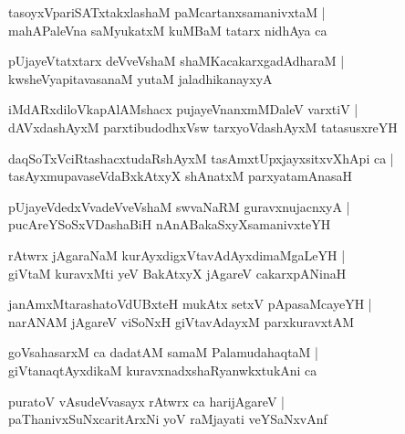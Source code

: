 \documentclass[twoside,12pt,openright]{book}
\newcounter{shloka}[chapter]
\begin{document}
\begin{shloka}%
tasoyxVpariSATxtakxlashaM paMcartanxsamanivxtaM |\\
mahAPaleVna saMyukatxM kuMBaM tatarx nidhAya ca 
\end{shloka}

\begin{shloka}%
pUjayeVtatxtarx deVveVshaM shaMKacakarxgadAdharaM |\\
kwsheVyapitavasanaM yutaM jaladhikanayxyA 
\end{shloka}

\begin{shloka}%
iMdARxdiloVkapAlAMshacx pujayeVnanxmMDaleV varxtiV |\\
dAVxdashAyxM parxtibudodhxVsw tarxyoVdashAyxM tatasusxreYH
\end{shloka}

\begin{shloka}%
daqSoTxVciRtashacxtudaRshAyxM tasAmxtUpxjayxsitxvXhApi ca |\\
tasAyxmupavaseVdaBxkAtxyX shAnatxM parxyatamAnasaH 
\end{shloka}

\begin{shloka}%
pUjayeVdedxVvadeVveVshaM swvaNaRM guravxnujacnxyA |\\
pucAreYSoSxVDashaBiH nAnABakaSxyXsamanivxteYH
\end{shloka}

\begin{shloka}%
rAtwrx jAgaraNaM kurAyxdigxVtavAdAyxdimaMgaLeYH |\\
giVtaM kuravxMti yeV BakAtxyX jAgareV cakarxpANinaH 
\end{shloka}

\begin{shloka}%
janAmxMtarashatoVdUBxteH mukAtx setxV pApasaMcayeYH |\\
narANAM jAgareV viSoNxH giVtavAdayxM parxkuravxtAM 
\end{shloka}

\begin{shloka}%
goVsahasarxM ca dadatAM samaM PalamudahaqtaM |\\
giVtanaqtAyxdikaM kuravxnadxshaRyanwkxtukAni ca 
\end{shloka}

\begin{shloka}%
puratoV vAsudeVvasayx rAtwrx ca harijAgareV |\\
paThanivxSuNxcaritArxNi yoV raMjayati veYSaNxvAnf 
\end{shloka}
\end{document}
